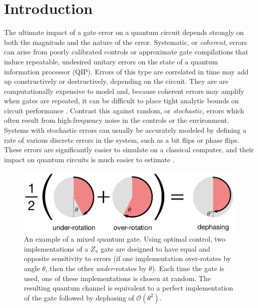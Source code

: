 \documentclass[aps,nofootinbib,pra,notitlepage,twocolumn]{revtex4-1}
\newcommand{\order}[1]{\mathcal{O}\left( #1 \right)}
\begin{document}
\section{Introduction}
\label{sec:introduction}
\noindent The ultimate impact of a gate error on a quantum circuit depends strongly on both the magnitude and the nature of the error. Systematic, or \emph{coherent}, errors can arise from poorly calibrated controls or approximate gate compilations that induce repeatable, undesired unitary errors on the state of a quantum information processor (QIP). Errors of this type are correlated in time may add up constructively or destructively, depending on the circuit. They are are  computationally expensive to model and, because coherent errors may amplify when gates are repeated, it can be difficult to place tight analytic bounds on circuit performance \cite{Beale2018}. Contrast this against random, or \emph{stochastic}, errors which often result from high-frequency noise in the controls or the environment. Systems with stochastic errors can usually be accurately modeled by defining a rate of various discrete errors in the system, such as a bit flips or phase flips. These errors are significantly easier to simulate on a classical computer, and their impact on quantum circuits is much easier to estimate \cite{Beale2018}.

\begin{figure}[t]
  \centering
  \includegraphics[width=\columnwidth]{simple_example.pdf}
  \caption{An example of a mixed quantum gate. Using optimal control, two implementations of a $Z_\pi$ gate are designed to have equal and opposite sensitivity to errors (if one implementation over-rotates by angle $\theta$, then the other \emph{under}-rotates by $\theta$). Each time the gate is used, one of these implementations is chosen at random. The resulting quantum channel is equivalent to a perfect implementation of the gate followed by dephasing of $\order{\theta^2}$.}
  \label{fig:simple_example}
\end{figure}
\end{document}
